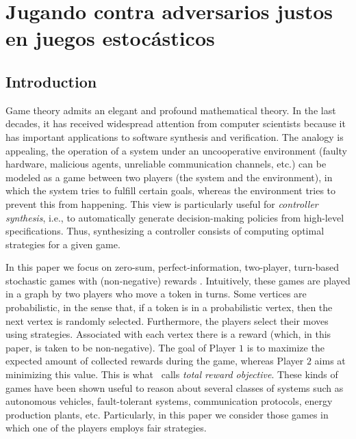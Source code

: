 \chapter{Jugando contra adversarios justos en juegos estocásticos}
\label{cap:fairAdversaries}


\section{Introduction} \label{sec:intro}
	Game theory \cite{MorgensternNeuman42}  admits an elegant and profound mathematical theory. 
	In the last decades, it has received widespread attention from computer scientists because it has important applications to software synthesis and verification. 
	The analogy is appealing, the operation of a system under an uncooperative environment (faulty hardware, malicious agents, unreliable communication channels, etc.) can be modeled as a game 
	between two players (the system and the environment), in which the system tries to fulfill certain goals, whereas the environment tries to prevent this from happening. 
	This view is particularly useful for \emph{controller synthesis}, i.e., to automatically generate decision-making policies from high-level specifications. 
	Thus, synthesizing a controller consists of computing optimal strategies for a given game.
		
	In this paper we  focus on zero-sum, perfect-information, two-player, turn-based stochastic games with (non-negative) rewards \cite{FilarV96}. 
	Intuitively, these games are played in a graph by two players who move a token in turns. Some vertices are probabilistic, in the sense that, if a token is in a probabilistic vertex, then 
	the next vertex is randomly selected. Furthermore, the players select their moves using strategies. Associated with each vertex there is a reward (which, in this paper, is taken to be non-negative).
	The goal of Player $1$ is to maximize the expected amount of collected rewards during the game, whereas Player $2$ aims at minimizing this value. 
	This is what~\cite{SvorenovaKwiatkowska16} calls \emph{total reward objective}.
	These kinds of games have been shown useful to reason about several classes of systems such as autonomous vehicles, 
	fault-tolerant systems, communication protocols, energy production plants, etc.  %
        Particularly, in this paper we consider those games in which one of the players employs fair strategies. 

